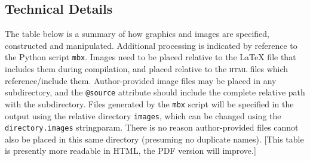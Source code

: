 \documentclass[10pt,]{article}
\newcommand{\initialism}[1]{\textsc{\MakeLowercase{#1}}}
\theoremstyle{plain}
\theoremstyle{definition}
\theoremstyle{definition}
\theoremstyle{definition}
\theoremstyle{definition}
\theoremstyle{definition}
\theoremstyle{definition}
\numberwithin{equation}{section}
\begin{document}
\subsection[{Technical Details}]{Technical Details}\label{subsection-25}
\hypertarget{p-272}{}%
The table below is a summary of how graphics and images are specified, constructed and manipulated.  Additional processing is indicated by reference to the Python script \lstinline?mbx?.  Images need to be placed relative to the \LaTeX{} file that includes them during compilation, and placed relative to the \initialism{HTML} files which reference/include them.  Author-provided image files may be placed in any subdirectory, and the \lstinline?@source? attribute should include the complete relative path with the subdirectory.  Files generated by the \lstinline?mbx? script will be specified in the output using the relative directory \lstinline?images?, which can be changed using the \lstinline?directory.images? stringparam.  There is no reason author-provided files cannot also be placed in this same directory (presuming no duplicate names). [This table is presently more readable in HTML, the PDF version will improve.]%
\end{document}
